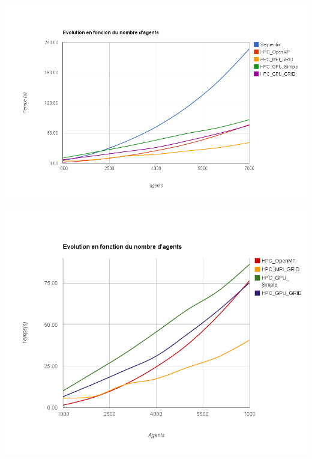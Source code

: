 \documentclass[liens,entete-ensimag,margeCorrection]{ensirapport}
\begin{document}
\includegraphics[width=\linewidth]{imageGlobale}

\includegraphics[width=\linewidth]{imageGlobalLight}
\end{document}

